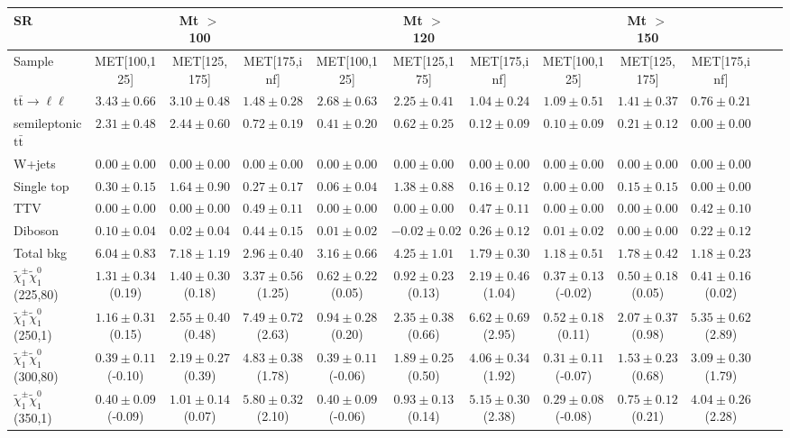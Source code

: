 \begin{table}
\begin{center}
\small
\begin{tabular}{lccccccccccc}
\hline
SR & & Mt $>$ 100 & & & Mt $>$ 120 & & &Mt $>$ 150 & & &\\
\hline
Sample&MET[100,125]&MET[125,175]&MET[175,inf]&MET[100,125]&MET[125,175]&MET[175,inf]&MET[100,125]&MET[125,175]&MET[175,inf]&\\
\hline
$\mathrm{t}\bar{\mathrm{t}}\rightarrow \ell\ell$&$3.43\pm0.66$&$3.10\pm0.48$&$1.48\pm0.28$&$2.68\pm0.63$&$2.25\pm0.41$&$1.04\pm0.24$&$1.09\pm0.51$&$1.41\pm0.37$&$0.76\pm0.21$\\
semileptonic $\mathrm{t}\bar{\mathrm{t}}$&$2.31\pm0.48$&$2.44\pm0.60$&$0.72\pm0.19$&$0.41\pm0.20$&$0.62\pm0.25$&$0.12\pm0.09$&$0.10\pm0.09$&$0.21\pm0.12$&$0.00\pm0.00$\\
W+jets&$0.00\pm0.00$&$0.00\pm0.00$&$0.00\pm0.00$&$0.00\pm0.00$&$0.00\pm0.00$&$0.00\pm0.00$&$0.00\pm0.00$&$0.00\pm0.00$&$0.00\pm0.00$\\
Single top&$0.30\pm0.15$&$1.64\pm0.90$&$0.27\pm0.17$&$0.06\pm0.04$&$1.38\pm0.88$&$0.16\pm0.12$&$0.00\pm0.00$&$0.15\pm0.15$&$0.00\pm0.00$\\
TTV&$0.00\pm0.00$&$0.00\pm0.00$&$0.49\pm0.11$&$0.00\pm0.00$&$0.00\pm0.00$&$0.47\pm0.11$&$0.00\pm0.00$&$0.00\pm0.00$&$0.42\pm0.10$\\
Diboson&$0.10\pm0.04$&$0.02\pm0.04$&$0.44\pm0.15$&$0.01\pm0.02$&$-0.02\pm0.02$&$0.26\pm0.12$&$0.01\pm0.02$&$0.00\pm0.00$&$0.22\pm0.12$\\
\hline
Total bkg&$6.04\pm0.83$&$7.18\pm1.19$&$2.96\pm0.40$&$3.16\pm0.66$&$4.25\pm1.01$&$1.79\pm0.30$&$1.18\pm0.51$&$1.78\pm0.42$&$1.18\pm0.23$\\
$\tilde{\chi}_{1}^{\pm}\tilde{\chi}_{1}^{0}$ (225,80)&$1.31\pm0.34$(0.19)&$1.40\pm0.30$(0.18)&$3.37\pm0.56$(1.25)&$0.62\pm0.22$(0.05)&$0.92\pm0.23$(0.13)&$2.19\pm0.46$(1.04)&$0.37\pm0.13$(-0.02)&$0.50\pm0.18$(0.05)&$0.41\pm0.16$(0.02)\\
$\tilde{\chi}_{1}^{\pm}\tilde{\chi}_{1}^{0}$ (250,1)&$1.16\pm0.31$(0.15)&$2.55\pm0.40$(0.48)&$7.49\pm0.72$(2.63)&$0.94\pm0.28$(0.20)&$2.35\pm0.38$(0.66)&$6.62\pm0.69$(2.95)&$0.52\pm0.18$(0.11)&$2.07\pm0.37$(0.98)&$5.35\pm0.62$(2.89)\\
$\tilde{\chi}_{1}^{\pm}\tilde{\chi}_{1}^{0}$ (300,80)&$0.39\pm0.11$(-0.10)&$2.19\pm0.27$(0.39)&$4.83\pm0.38$(1.78)&$0.39\pm0.11$(-0.06)&$1.89\pm0.25$(0.50)&$4.06\pm0.34$(1.92)&$0.31\pm0.11$(-0.07)&$1.53\pm0.23$(0.68)&$3.09\pm0.30$(1.79)\\
$\tilde{\chi}_{1}^{\pm}\tilde{\chi}_{1}^{0}$ (350,1)&$0.40\pm0.09$(-0.09)&$1.01\pm0.14$(0.07)&$5.80\pm0.32$(2.10)&$0.40\pm0.09$(-0.06)&$0.93\pm0.13$(0.14)&$5.15\pm0.30$(2.38)&$0.29\pm0.08$(-0.08)&$0.75\pm0.12$(0.21)&$4.04\pm0.26$(2.28)\\
\hline
\hline\hline
\end{tabular}
\end{center}
\end{table}
